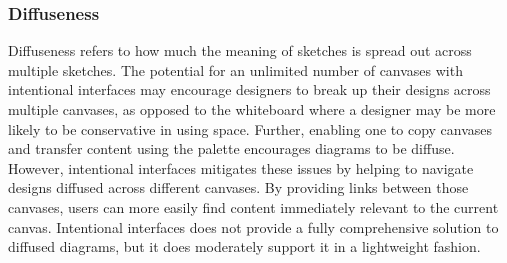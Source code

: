 
\subsubsection{Diffuseness}
Diffuseness refers to how much the meaning of sketches is spread out across multiple sketches. The potential for an unlimited number of canvases with intentional interfaces may encourage designers to break up their designs across multiple canvases, as opposed to the whiteboard where a designer may be more likely to be conservative in using space. Further, enabling one to copy canvases and transfer content using the palette encourages diagrams to be diffuse. However, intentional interfaces mitigates these issues by helping to navigate designs diffused across different canvases. By providing links between those  canvases, users can more easily find content immediately relevant to the current canvas. Intentional interfaces does not provide a fully comprehensive solution to diffused diagrams, but it does moderately support it in a lightweight fashion.



